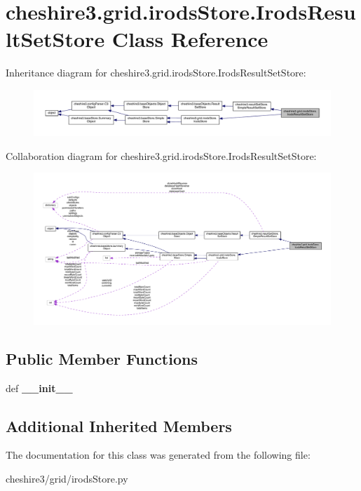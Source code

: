 \hypertarget{classcheshire3_1_1grid_1_1irods_store_1_1_irods_result_set_store}{\section{cheshire3.\-grid.\-irods\-Store.\-Irods\-Result\-Set\-Store Class Reference}
\label{classcheshire3_1_1grid_1_1irods_store_1_1_irods_result_set_store}
}


Inheritance diagram for cheshire3.\-grid.\-irods\-Store.\-Irods\-Result\-Set\-Store\-:
\nopagebreak
\begin{figure}[H]
\begin{center}
\leavevmode
\includegraphics[width=350pt]{classcheshire3_1_1grid_1_1irods_store_1_1_irods_result_set_store__inherit__graph}
\end{center}
\end{figure}


Collaboration diagram for cheshire3.\-grid.\-irods\-Store.\-Irods\-Result\-Set\-Store\-:
\nopagebreak
\begin{figure}[H]
\begin{center}
\leavevmode
\includegraphics[width=350pt]{classcheshire3_1_1grid_1_1irods_store_1_1_irods_result_set_store__coll__graph}
\end{center}
\end{figure}
\subsection*{Public Member Functions}
\begin{DoxyCompactItemize}
\item 
\hypertarget{classcheshire3_1_1grid_1_1irods_store_1_1_irods_result_set_store_a6031cbef2050aa40434d2687eb97fb37}{def {\bfseries \-\_\-\-\_\-init\-\_\-\-\_\-}}\label{classcheshire3_1_1grid_1_1irods_store_1_1_irods_result_set_store_a6031cbef2050aa40434d2687eb97fb37}

\end{DoxyCompactItemize}
\subsection*{Additional Inherited Members}


The documentation for this class was generated from the following file\-:\begin{DoxyCompactItemize}
\item 
cheshire3/grid/irods\-Store.\-py\end{DoxyCompactItemize}
